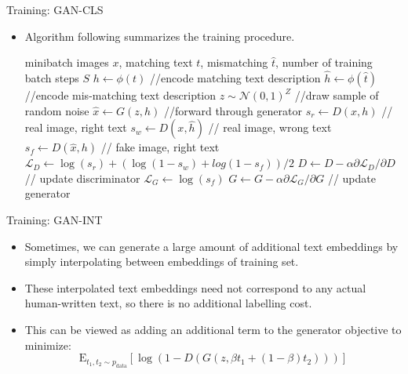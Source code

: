 \documentclass[10pt]{beamer}
\begin{document}
	\begin{frame}{Training: GAN-CLS}
		\begin{itemize}
			\item Algorithm following summarizes the training procedure.
			\pause
			\begin{algorithm}[H]
				\footnotesize
				\caption*{\textbf{Algorithm} \footnotesize GAN-CLS training algorithm with step size $\alpha$, using minibatch SGD for simplicity.}
				\begin{algorithmic}
					\pause
					\REQUIRE minibatch images $x$, matching text $t$, mismatching $\hat{t}$, number of training batch steps $S$
					\pause
						\pause
						\STATE $h\leftarrow\phi(t)$ //encode matching text description
						\pause
						\STATE $\hat{h}\leftarrow\phi(\hat{t})$ //encode mis-matching text description
						\pause
						\STATE $z\sim\mathcal{N}(0,1)^Z$ //draw sample of random noise
						\pause
						\STATE $\hat{x}\leftarrow G(z,h)$ //forward through generator
						\pause
						\STATE $s_r\leftarrow D(x,h)$ // real image, right text
						\pause
						\STATE $s_w\leftarrow D(x,\hat{h})$ // real image, wrong text
						\pause
						\STATE $s_f\leftarrow D(\hat{x},h)$ // fake image, right text
						\pause
						\STATE $\mathcal{L}_D\leftarrow\log(s_r)+(\log(1-s_w)+log(1-s_f))/2$  
						\pause
						\STATE $D\leftarrow D-\alpha\partial\mathcal{L}_D/\partial D$ // update discriminator
						\pause
						\STATE $\mathcal{L}_G\leftarrow\log(s_f)$
						\pause
						\STATE $G\leftarrow G-\alpha\partial\mathcal{L}_G/\partial G$ // update generator
					\ENDFOR
				\end{algorithmic}
			\end{algorithm}
		\end{itemize}
	\end{frame}

	\begin{frame}{Training: GAN-INT}
		\begin{itemize}
			\item Sometimes, we can generate a large amount of additional text embeddings by simply interpolating between embeddings of training set.
			\pause
			\item These interpolated text embeddings need not correspond to any actual human-written text, so there is no additional labelling cost.
			\pause
			\item This can be viewed as adding an additional term to the generator objective to minimize:
			$$
			\mathrm{E}_{t_1,t_2\sim p_{\text{data}}}\left[\log(1-D(G(z,\beta t_1+(1-\beta)t_2)))\right]
			$$
		\end{itemize}
	\end{frame}
\end{document}
